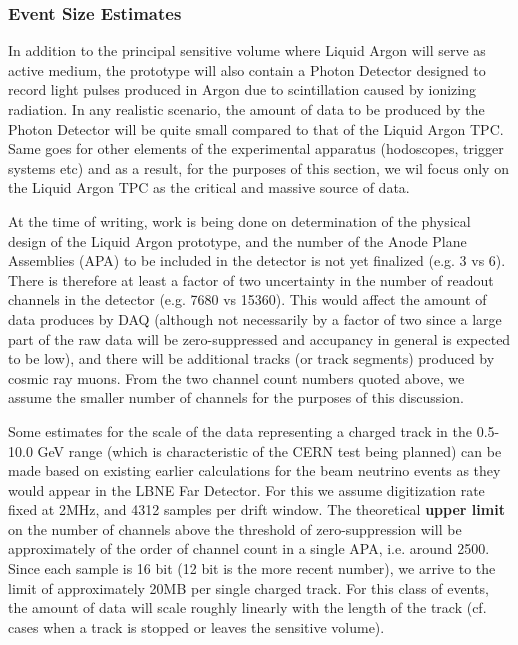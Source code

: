 \subsubsection{Event Size Estimates}

In addition to the principal sensitive volume where Liquid Argon will serve as active medium, the prototype will also contain a Photon Detector designed
to record light pulses produced in Argon due to scintillation caused by ionizing radiation. In any realistic scenario, the amount of data to be produced by
the Photon Detector will be quite small compared to that of the Liquid Argon TPC. Same goes for other elements of the experimental apparatus (hodoscopes,
trigger systems etc) and as a result, for the purposes of this section, we wil focus only on the Liquid Argon TPC as the critical and massive source of data.

At the time of writing, work is being done on determination of the physical design of the Liquid Argon prototype, and the number of the Anode Plane Assemblies (APA) to
be included in the detector is not yet finalized (e.g. 3 vs 6). There is therefore at least a factor of two uncertainty in the number of readout channels in the detector (e.g. 7680 vs 15360).
This would affect the amount of data produces by DAQ (although not necessarily by a factor of two since a large part of the raw data will be zero-suppressed and accupancy in general
is expected to be low), and there will be additional tracks (or track segments)  produced by cosmic ray muons. From the two channel count numbers quoted above,
we assume the smaller number of channels for the purposes of this discussion.

Some estimates for the scale of the data representing a charged track in the 0.5-10.0 GeV range (which is characteristic of the CERN test being planned)
can be made based on existing earlier calculations for the beam neutrino events as they would appear in the LBNE Far Detector.
For this we assume digitization rate fixed at 2MHz, and 4312 samples per drift window. The theoretical \textbf{upper limit} on the number of channels above the threshold
of zero-suppression will be approximately of the order of channel count in a single APA, i.e. around 2500. Since each sample is 16 bit (12 bit is the more recent number),
we arrive to the limit of approximately 20MB per single charged track. For this class of events, the amount of data will scale roughly linearly with the length of the track (cf. cases
when a track is stopped or leaves the sensitive volume).

